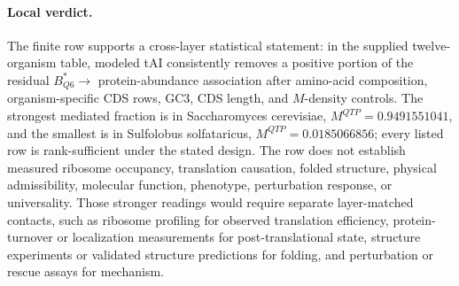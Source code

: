 \paragraph{Local verdict.}
The finite row supports a cross-layer statistical statement: in the supplied twelve-organism table, modeled tAI consistently removes a positive portion of the residual $B^*_{Q6}\to$ protein-abundance association after amino-acid composition, organism-specific CDS rows, GC3, CDS length, and $M$-density controls.  The strongest mediated fraction is in Saccharomyces cerevisiae, $M^{QTP}=0.9491551041$, and the smallest is in Sulfolobus solfataricus, $M^{QTP}=0.0185066856$; every listed row is rank-sufficient under the stated design.  The row does not establish measured ribosome occupancy, translation causation, folded structure, physical admissibility, molecular function, phenotype, perturbation response, or universality.  Those stronger readings would require separate layer-matched contacts, such as ribosome profiling for observed translation efficiency, protein-turnover or localization measurements for post-translational state, structure experiments or validated structure predictions for folding, and perturbation or rescue assays for mechanism.
